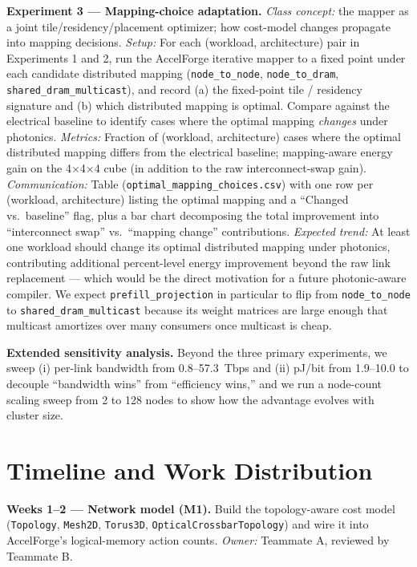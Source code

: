 \documentclass[conference,onecolumn]{IEEEtran}
\begin{document}
\textbf{Experiment 3 --- Mapping-choice adaptation.}
\emph{Class concept:} the mapper as a joint tile/residency/placement
optimizer; how cost-model changes propagate into mapping decisions.
\emph{Setup:} For each (workload, architecture) pair in Experiments 1 and 2,
run the AccelForge iterative mapper to a fixed point under each candidate
distributed mapping (\texttt{node\_to\_node}, \texttt{node\_to\_dram},
\texttt{shared\_dram\_multicast}), and record (a) the fixed-point tile /
residency signature and (b) which distributed mapping is optimal. Compare
against the electrical baseline to identify cases where the optimal mapping
\emph{changes} under photonics.
\emph{Metrics:} Fraction of (workload, architecture) cases where the optimal
distributed mapping differs from the electrical baseline; mapping-aware
energy gain on the 4$\times$4$\times$4 cube (in addition to the raw
interconnect-swap gain).
\emph{Communication:} Table (\texttt{optimal\_mapping\_choices.csv}) with one
row per (workload, architecture) listing the optimal mapping and a
``Changed vs.\ baseline'' flag, plus a bar chart decomposing the total
improvement into ``interconnect swap'' vs.\ ``mapping change'' contributions.
\emph{Expected trend:} At least one workload should change its optimal
distributed mapping under photonics, contributing additional percent-level
energy improvement beyond the raw link replacement --- which would be the
direct motivation for a future photonic-aware compiler. We expect
\texttt{prefill\_projection} in particular to flip from \texttt{node\_to\_node}
to \texttt{shared\_dram\_multicast} because its weight matrices are large
enough that multicast amortizes over many consumers once multicast is cheap.

\textbf{Extended sensitivity analysis.}
Beyond the three primary experiments, we sweep (i) per-link bandwidth from
0.8--57.3~Tbps and (ii) pJ/bit from 1.9--10.0 to decouple ``bandwidth wins''
from ``efficiency wins,'' and we run a node-count scaling sweep from 2 to 128
nodes to show how the advantage evolves with cluster size.


\section{Timeline and Work Distribution}
\textbf{Weeks 1--2 --- Network model (M1).}
Build the topology-aware cost model (\texttt{Topology}, \texttt{Mesh2D},
\texttt{Torus3D}, \texttt{OpticalCrossbarTopology}) and wire it into
AccelForge's logical-memory action counts. \emph{Owner:} Teammate A,
reviewed by Teammate B.
\end{document}
